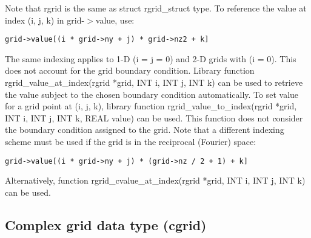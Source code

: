 \documentclass[12pt,letterpaper]{article}
\begin{document}
\noindent
Note that rgrid is the same as struct rgrid\_struct type. To reference the value at index (i, j, k) in grid-$>$value, use:
\begin{verbatim}
grid->value[(i * grid->ny + j) * grid->nz2 + k]
\end{verbatim}
The same indexing applies to 1-D (i = j = 0) and 2-D grids with (i = 0). This does not account for the grid boundary condition. Library function rgrid\_value\_at\_index(rgrid *grid, INT i, INT j, INT k) can be used to retrieve the value subject to the chosen boundary condition automatically. To set value for a grid point at (i, j, k), library function rgrid\_value\_to\_index(rgrid *grid, INT i, INT j, INT k, REAL value) can be used. This function does not consider the boundary condition assigned to the grid. Note that a different indexing scheme must be used if the grid is in the reciprocal (Fourier) space:
\begin{verbatim}
grid->value[(i * grid->ny + j) * (grid->nz / 2 + 1) + k]
\end{verbatim}
Alternatively, function rgrid\_cvalue\_at\_index(rgrid *grid, INT i, INT j, INT k) can be used.

\subsection{Complex grid data type (cgrid)}
\end{document}
